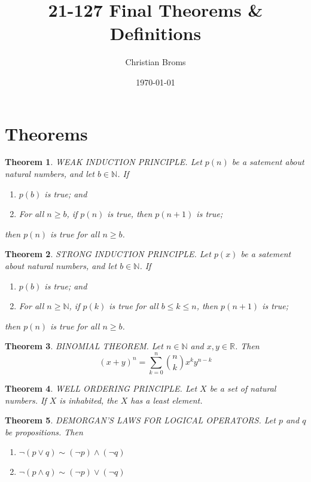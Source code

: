 \documentclass[12pt]{article}
\newtheorem{theorem}{Theorem}
\newcommand{\R}{\mathbb{R}}
\newcommand{\N}{\mathbb{N}}
\begin{document}
\title{21-127 Final Theorems \& Definitions}
\author{Christian Broms}
\date{\today}
\maketitle

\section{Theorems}


\begin{theorem}
WEAK INDUCTION PRINCIPLE. Let $p(n)$ be a satement about natural numbers, and let $b \in \N$. If 
\begin{enumerate}
    \item $p(b)$ is true; and
    \item For all $n \geq b$, if $p(n)$ is true, then $p(n+1)$ is true;
\end{enumerate}
then $p(n)$ is true for all $n \geq b$. 
\end{theorem}


\begin{theorem}
STRONG INDUCTION PRINCIPLE. Let $p(x)$ be a satement about natural numbers, and let $b \in \N$. If 
\begin{enumerate}
    \item $p(b)$ is true; and
    \item For all $n \geq \N$, if $p(k)$ is true for all $b \leq k \leq n$, then $p(n+1)$ is true;
\end{enumerate}
then $p(n)$ is true for all $n \geq b$. 
\end{theorem}


\begin{theorem}
BINOMIAL THEOREM. Let $n \in \N$ and $x, y \in \R$. Then
$$(x + y)^n = \sum_{k=0}^{n}\binom{n}{k}x^k y^{n-k}$$
\end{theorem}


\begin{theorem}
WELL ORDERING PRINCIPLE. Let $X$ be a set of natural numbers. If $X$ is inhabited, the $X$ has a least element. 
\end{theorem}


\begin{theorem}
DEMORGAN'S LAWS FOR LOGICAL OPERATORS. Let $p$ and $q$ be propositions. Then
\begin{enumerate}
    \item $\neg(p \vee q) \sim (\neg p) \wedge (\neg q)$ 
    \item $\neg(p \wedge q) \sim (\neg p) \vee (\neg q)$
\end{enumerate}
\end{theorem}
\end{document}
